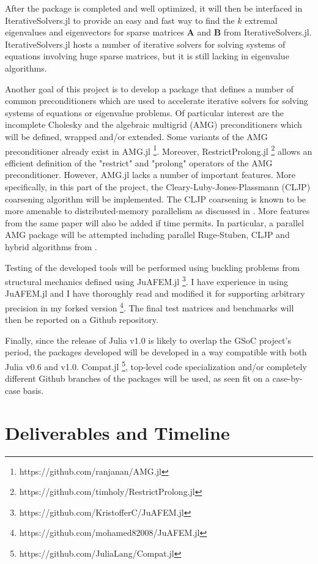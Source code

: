 \documentclass[12pt]{article}
\begin{document}
After the package is completed and well optimized, it will then be interfaced in IterativeSolvers.jl to provide an easy and fast way to find the $k$ extremal eigenvalues and eigenvectors for sparse matrices $\bm{A}$ and $\bm{B}$ from IterativeSolvers.jl. IterativeSolvers.jl hosts a number of iterative solvers for solving systems of equations involving huge sparse matrices, but it is still lacking in eigenvalue algorithms.

Another goal of this project is to develop a package that defines a number of common preconditioners which are used to accelerate iterative solvers for solving systems of equations or eigenvalue problems. Of particular interest are the incomplete Cholesky and the algebraic multigrid (AMG) preconditioners which will be defined, wrapped and/or extended. Some variants of the AMG preconditioner already exist in AMG.jl \footnote{https://github.com/ranjanan/AMG.jl}. Moreover, RestrictProlong.jl \footnote{https://github.com/timholy/RestrictProlong.jl} allows an efficient definition of the "restrict" and "prolong" operators of the AMG preconditioner. However, AMG.jl lacks a number of important features. More specifically, in this part of the project, the Cleary-Luby-Jones-Plassmann (CLJP) coarsening algorithm will be implemented. The CLJP coarsening is known to be more amenable to distributed-memory parallelism as discussed in \cite{Henson2002}. More features from the same paper will also be added if time permits. In particular, a parallel AMG package will be attempted including parallel Ruge-Stuben, CLJP and hybrid algorithms from \cite{Henson2002}.

Testing of the developed tools will be performed using buckling problems from structural mechanics defined using JuAFEM.jl \footnote{https://github.com/KristofferC/JuAFEM.jl}. I have experience in using JuAFEM.jl and I have thoroughly read and modified it for supporting arbitrary precision in my forked version \footnote{https://github.com/mohamed82008/JuAFEM.jl}. The final test matrices and benchmarks will then be reported on a Github repository.

Finally, since the release of Julia v1.0 is likely to overlap the GSoC project's period, the packages developed will be developed in a way compatible with both Julia v0.6 and v1.0. Compat.jl \footnote{https://github.com/JuliaLang/Compat.jl}, top-level code specialization and/or completely different Github branches of the packages will be used, as seen fit on a case-by-case basis.

\section{Deliverables and Timeline}
\end{document}
